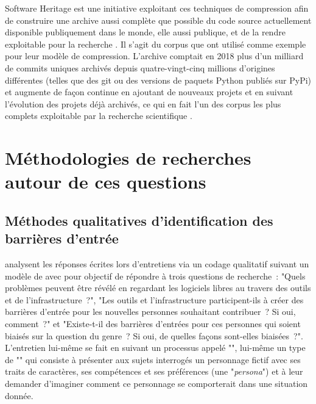 Software Heritage est une initiative exploitant ces
techniques de compression afin de construire une archive aussi complète que possible du code source
actuellement disponible publiquement dans le monde, elle aussi publique, et de la rendre exploitable pour la
recherche . Il s'agit du corpus que \textcite{swh-graph-2020} ont utilisé comme
exemple pour leur modèle de compression. L'archive comptait en 2018 plus d'un milliard de \glspl{commit}
uniques archivés depuis quatre-vingt-cinq millions d'origines différentes (telles que des 
\gls{git} ou des versions de paquets Python publiés sur PyPi) et augmente de
façon continue en ajoutant de nouveaux projets et en suivant l'évolution des projets déjà archivés, ce qui en
fait l'un des corpus les plus complets exploitable par la recherche scientifique
.

\section{Méthodologies de recherches autour de ces questions}

\subsection{Méthodes qualitatives d'identification des barrières d'entrée}

\textcite[p.~1006]{barriers-2018} analysent les réponses écrites lors d'entretiens via un codage qualitatif
suivant un modèle de  avec pour objectif de répondre à trois questions de
recherche : "Quels problèmes peuvent être révélé en regardant les logiciels libres au travers des outils et de
l'infrastructure ?", "Les outils et l'infrastructure participent-ils à créer des barrières d'entrée pour les
nouvelles personnes souhaitant contribuer ? Si oui, comment ?" et "Existe-t-il des barrières d'entrées pour
ces personnes qui soient biaisés sur la question du genre ? Si oui, de quelles façons sont-elles biaisées ?".
L'entretien lui-même se fait en suivant un processus appelé "", lui-même un type de
"" qui consiste à présenter aux sujets interrogés un personnage fictif avec ses
traits de caractères, ses compétences et ses préférences (une "\emph{persona}") et à leur demander d'imaginer
comment ce personnage se comporterait dans une situation donnée.

